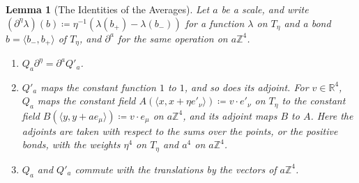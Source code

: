 \documentclass[11pt]{preprint}
\numberwithin{equation}{section}
\newtheorem{lemma}[theorem]{Lemma}
\theoremstyle{definition}
\theoremstyle{remark}
\theoremstyle{plain}
\begin{document}
\begin{lemma}[The Identities of the Averages]\label{lem:identities}
Let $a$ be a scale, and write $(\partial^\eta\lambda)(b) \coloneqq \eta^{-1}(\lambda(b_+) - \lambda(b_-))$ for a function $\lambda$ on $T_\eta$ and a bond $b = \langle b_-, b_+\rangle$ of $T_\eta$, and $\partial^a$ for the same operation on $a\mathbb Z^4$.
\begin{enumerate}[label=(\roman*)]
\item $Q_a\partial^\eta = \partial^aQ'_a$.
\item $Q'_a$ maps the constant function $1$ to $1$, and so does its adjoint. For $v \in \mathbb R^4$, $Q_a$ maps the constant field $A(\langle x, x + \eta e'_\nu\rangle) \coloneqq v \cdot e'_\nu$ on $T_\eta$ to the constant field $B(\langle y, y + ae_\mu\rangle) \coloneqq v \cdot e_\mu$ on $a\mathbb Z^4$, and its adjoint maps $B$ to $A$. Here the adjoints are taken with respect to the sums over the points, or the positive bonds, with the weights $\eta^4$ on $T_\eta$ and $a^4$ on $a\mathbb Z^4$.
\item $Q_a$ and $Q'_a$ commute with the translations by the vectors of $a\mathbb Z^4$.
\end{enumerate}
\end{lemma}
\end{document}
